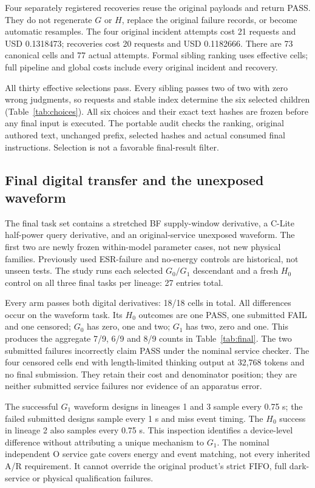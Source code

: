 Four separately registered recoveries reuse the original payloads and return
PASS. They do not regenerate $G$ or $H$, replace the original failure records,
or become automatic resamples. The four original incident attempts cost 21
requests and USD 0.1318473; recoveries cost 20 requests and USD 0.1182666.
There are 73 canonical cells and 77 actual attempts. Formal sibling ranking
uses effective cells; full pipeline and global costs include every original
incident and recovery.


All thirty effective selections pass. Every sibling passes two of two with
zero wrong judgments, so requests and stable index determine the six selected
children (Table~\ref{tab:choices}). All six choices and their exact text hashes
are frozen before any final input is executed. The portable audit checks the
ranking, original authored text, unchanged prefix, selected hashes and actual
consumed final instructions. Selection is not a favorable final-result filter.

\subsection{Final digital transfer and the unexposed waveform}
The final task set contains a stretched BF supply-window derivative, a C-Lite
half-power query derivative, and an original-service unexposed waveform. The
first two are newly frozen within-model parameter cases, not new physical
families. Previously used ESR-failure and no-energy controls are historical,
not unseen tests. The study runs each selected $G_0/G_1$ descendant and a fresh
$H_0$ control on all three final tasks per lineage: 27 entries total.


Every arm passes both digital derivatives: 18/18 cells in total. All differences
occur on the waveform task. Its $H_0$ outcomes are one PASS, one submitted FAIL
and one censored; $G_0$ has zero, one and two; $G_1$ has two, zero and one.
This produces the aggregate 7/9, 6/9 and 8/9 counts in
Table~\ref{tab:final}. The two submitted failures incorrectly claim PASS under
the nominal service checker. The four censored cells end with length-limited
thinking output at 32,768 tokens and no final submission. They retain their
cost and denominator position; they are neither submitted service failures
nor evidence of an apparatus error.

The successful $G_1$ waveform designs in lineages 1 and 3 sample every 0.75 s;
the failed submitted designs sample every 1 s and miss event timing. The
$H_0$ success in lineage 2 also samples every 0.75 s. This inspection identifies
a device-level difference without attributing a unique mechanism to $G_1$.
The nominal independent O service gate covers energy and event matching, not
every inherited A/R requirement. It cannot override the original product's
strict FIFO, full dark-service or physical qualification failures.

